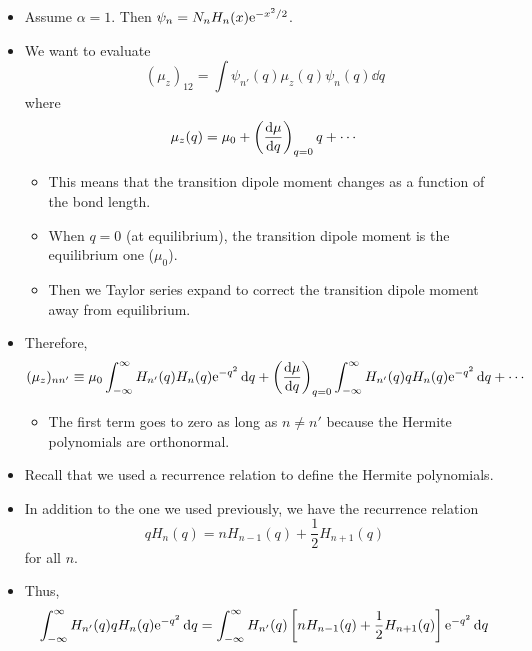 \documentclass[../notes.tex]{subfiles}
\begin{document}
\begin{itemize}
\begin{itemize}
        \item Assume $\alpha=1$. Then $\psi_n=N_nH_n(x)\e[-x^2/2]$.
        \item We want to evaluate
        \begin{equation*}
            (\mu_z)_{12} = \int\psi_{n'}(q)\mu_z(q)\psi_n(q)\dd{q}
        \end{equation*}
        where
        \begin{equation*}
            \mu_z(q) = \mu_0+\left( \dv{\mu}{q} \right)_{q=0}q+\cdots
        \end{equation*}
        \begin{itemize}
            \item This means that the transition dipole moment changes as a function of the bond length.
            \item When $q=0$ (at equilibrium), the transition dipole moment is the equilibrium one ($\mu_0$).
            \item Then we Taylor series expand to correct the transition dipole moment away from equilibrium.
        \end{itemize}
        \item Therefore,
        \begin{equation*}
            (\mu_z)_{nn'} \equiv \mu_0\int_{-\infty}^\infty H_{n'}(q)H_n(q)\e[-q^2]\dd{q}+\left( \dv{\mu}{q} \right)_{q=0}\int_{-\infty}^\infty H_{n'}(q)qH_n(q)\e[-q^2]\dd{q}+\cdots
        \end{equation*}
        \begin{itemize}
            \item The first term goes to zero as long as $n\neq n'$ because the Hermite polynomials are orthonormal.
        \end{itemize}
        \item Recall that we used a recurrence relation to define the Hermite polynomials.
        \item In addition to the one we used previously, we have the recurrence relation
        \begin{equation*}
            qH_n(q) = nH_{n-1}(q)+\frac{1}{2}H_{n+1}(q)
        \end{equation*}
        for all $n$.
        \item Thus,
        \begin{equation*}
            \int_{-\infty}^\infty H_{n'}(q)qH_n(q)\e[-q^2]\dd{q} = \int_{-\infty}^\infty H_{n'}(q)\left[ nH_{n-1}(q)+\frac{1}{2}H_{n+1}(q) \right]\e[-q^2]\dd{q}
        \end{equation*}

\end{itemize}
\end{itemize}
\end{document}
